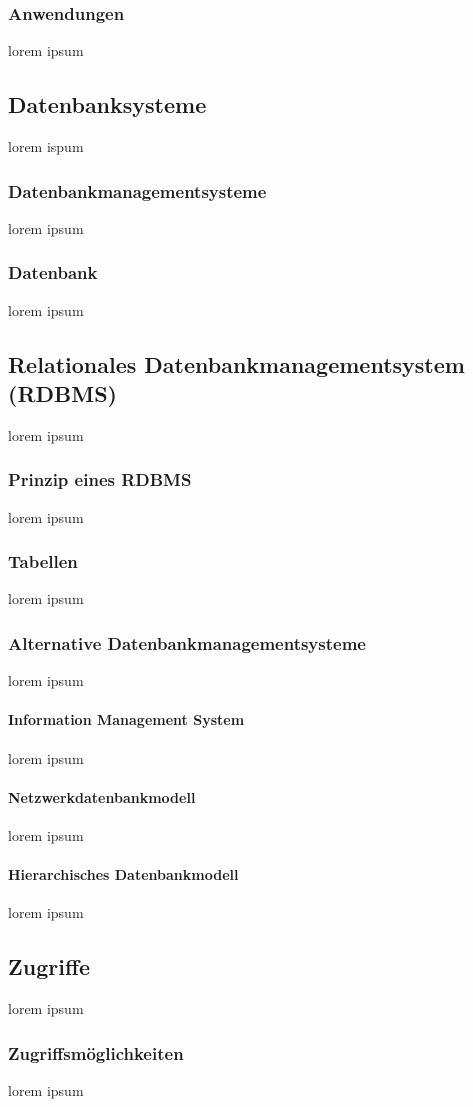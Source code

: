 \documentclass[10pt,a4paper]{report}
\begin{document}
\subsubsection{Anwendungen}
lorem ipsum
\subsection{Datenbanksysteme}
lorem ispum
\subsubsection{Datenbankmanagementsysteme}
lorem ipsum
\subsubsection{Datenbank}
lorem ipsum
\subsection{Relationales Datenbankmanagementsystem (RDBMS)}
lorem ipsum
\subsubsection{Prinzip eines RDBMS}
lorem ipsum
\subsubsection{Tabellen}
lorem ipsum
\subsubsection{Alternative Datenbankmanagementsysteme}
lorem ipsum
\paragraph{Information Management System}
lorem ipsum
\paragraph{Netzwerkdatenbankmodell}
lorem ipsum
\paragraph{Hierarchisches Datenbankmodell}
lorem ipsum
\subsection{Zugriffe}
lorem ipsum
\subsubsection{Zugriffsmöglichkeiten}
lorem ipsum
\end{document}
